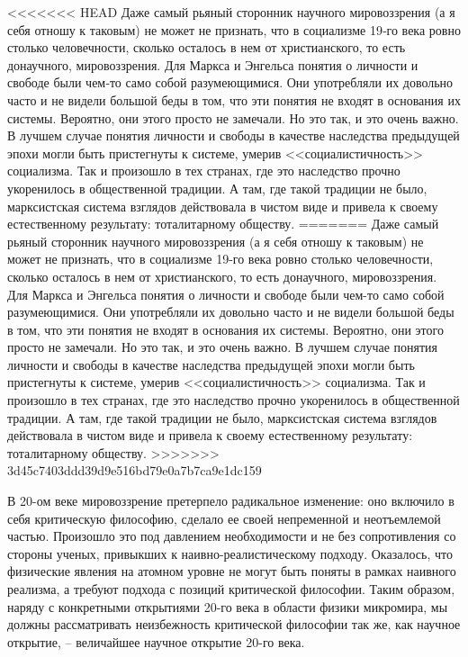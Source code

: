 \documentclass{book}
\begin{document}
<<<<<<< HEAD
Даже самый рьяный сторонник научного мировоззрения (а я себя отношу к таковым) не может не признать, что в социа­лизме 19‑го века ровно столько человечности, сколько оста­лось в нем от христианского, то есть донаучного, мировоззре­ния. Для Маркса и Энгельса понятия о личности и свободе были чем‑то само собой разумеющимися. Они употребляли их довольно часто и не видели большой беды в том, что эти понятия не входят в основания  их системы. Вероятно, они этого просто не замечали. Но это так, и это очень важно. В луч­шем случае понятия личности и свободы в качестве наследства предыдущей эпохи могли быть пристегнуты к системе, умерив <<социалистичность>> социализма. Так и произошло в тех стра­нах, где это наследство прочно укоренилось в общественной традиции. А там, где такой традиции не было, марксистская си­стема взглядов действовала в чистом виде и привела к своему естественному результату: тоталитарному обществу.
=======
Даже самый рьяный сторонник научного мировоззрения (а я себя отношу к таковым) не может не признать, что в социа­лизме 19-го века ровно столько человечности, сколько оста­лось в нем от христианского, то есть донаучного, мировоззре­ния. Для Маркса и Энгельса понятия о личности и свободе были чем-то само собой разумеющимися. Они употребляли их довольно часто и не видели большой беды в том, что эти понятия не входят в основания  их системы. Вероятно, они этого просто не замечали. Но это так, и это очень важно. В луч­шем случае понятия личности и свободы в качестве наследства предыдущей эпохи могли быть пристегнуты к системе, умерив <<социалистичность>> социализма. Так и произошло в тех стра­нах, где это наследство прочно укоренилось в общественной традиции. А там, где такой традиции не было, марксистская си­стема взглядов действовала в чистом виде и привела к своему естественному результату: тоталитарному обществу.
>>>>>>> 3d45c7403ddd39d9e516bd79e0a7b7ca9e1dc159

В 20-ом веке мировоззрение претерпело радикальное изме­нение: оно включило в себя критическую философию, сдела­ло ее своей непременной и неотъемлемой частью. Произошло это под давлением необходимости и не без сопротивления со стороны ученых, привыкших к наивно-реалистическому подходу. Оказалось, что физические явления на атомном уровне не могут быть поняты в рамках наивного реализма, а требуют подхода с позиций критической философии. Таким образом, наряду с конкретными открытиями 20-го века в области физики микромира, мы должны рассматривать неизбежность критиче­ской философии  так же, как научное открытие, --  величайшее научное открытие 20-го века.
\end{document}
